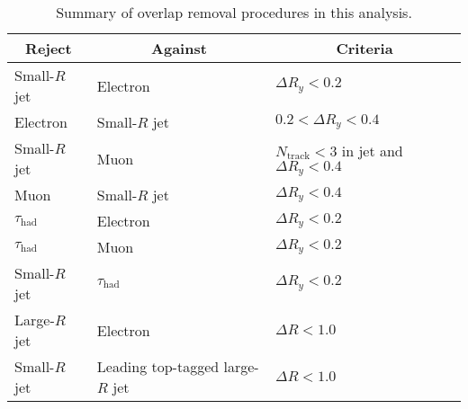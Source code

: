 \begin{table}[H]
  \centering
  \begin{tabular*}{130mm}{lll}
    \hline\hline
    \multicolumn{1}{c}{Reject} & \multicolumn{1}{c}{Against}      & \multicolumn{1}{c}{Criteria}\\
    \hline
    Small-$R$ jet              & Electron                         & ${\Delta}R_{y}<0.2$\\
    Electron                   & Small-$R$ jet                    & $0.2<{\Delta}R_{y}<0.4$\\
    Small-$R$ jet              & Muon                             & $N_{\text{track}}<3$ in jet and ${\Delta}R_{y}<0.4$\\
    Muon                       & Small-$R$ jet                    & ${\Delta}R_{y}<0.4$\\
    ${\tau}_\text{had}$        & Electron                         & ${\Delta}R_{y}<0.2$\\
    ${\tau}_\text{had}$        & Muon                             & ${\Delta}R_{y}<0.2$\\
    Small-$R$ jet              & ${\tau}_\text{had}$              & ${\Delta}R_{y}<0.2$\\
    Large-$R$ jet              & Electron                         & ${\Delta}R    <1.0$\\
    Small-$R$ jet              & Leading top-tagged large-$R$ jet & ${\Delta}R    <1.0$\\
    \hline\hline
  \end{tabular*}
  \caption{Summary of overlap removal procedures in this analysis.}
  \label{tab:OLR}
\end{table}
